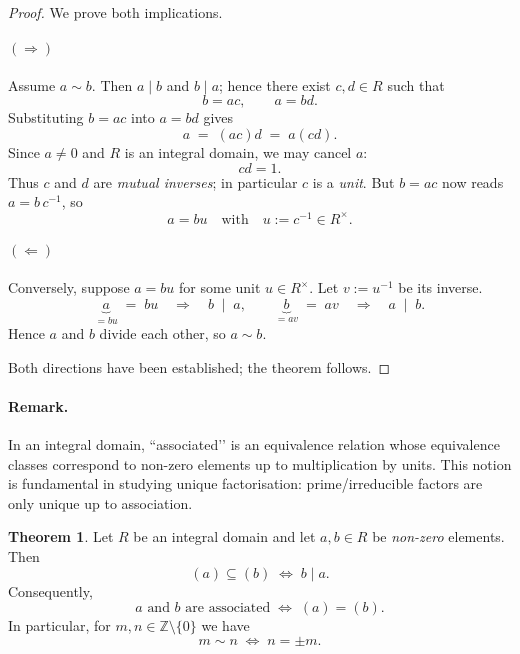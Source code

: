 \documentclass[12pt]{article}
\theoremstyle{definition} %
\newtheorem{theorem}{Theorem}
\theoremstyle{plain} %
\begin{document}
\begin{proof}
  We prove both implications.

  \paragraph*{\((\Rightarrow)\)}
  Assume \(a\sim b\).  
  Then \(a\mid b\) and \(b\mid a\); hence there exist \(c,d\in R\) such that
  \[
      b = ac,
      \qquad
      a = bd .
  \]
  Substituting \(b=ac\) into \(a=bd\) gives
  \[
      a
      \;=\;
      (ac)d
      \;=\;
      a(cd).
  \]
  Since \(a\neq0\) and \(R\) is an integral domain, we may cancel \(a\):
  \[
      cd = 1 .
  \]
  Thus \(c\) and \(d\) are \emph{mutual inverses}; in particular
  \(c\) is a \emph{unit}.  
  But \(b = ac\) now reads \(a = b\,c^{-1}\), so
  \[
      a = bu
      \quad\text{with}\quad
      u := c^{-1}\in R^{\times}.
  \]

  \paragraph*{\((\Leftarrow)\)}
  Conversely, suppose \(a = bu\) for some unit \(u\in R^{\times}\).
  Let \(v:=u^{-1}\) be its inverse.
  \[
      \underbrace{a}_{=bu}\;=\;bu 
      \quad\Longrightarrow\quad
      b\;\mid\; a ,
      \qquad
      \underbrace{b}_{=av}\;=\;av 
      \quad\Longrightarrow\quad
      a\;\mid\; b .
  \]
  Hence \(a\) and \(b\) divide each other, so \(a\sim b\).

  Both directions have been established; the theorem follows.
\end{proof}

\paragraph{Remark.}
In an integral domain, “associated’’ is an equivalence relation whose
equivalence classes correspond to non-zero elements up to multiplication by units.
This notion is fundamental in studying unique factorisation:
prime/irreducible factors are only unique up to association.
\begin{theorem}
  Let \(R\) be an integral domain and let \(a,b\in R\) be \emph{non-zero} elements.  
  Then
  \[
     (a) \subseteq (b)
     \;\Longleftrightarrow\;
     b \mid a .
  \]
  Consequently,
  \[
     a \text{ and } b \text{ are associated}
     \;\Longleftrightarrow\;
     (a) = (b).
  \]
  In particular, for \(m,n\in\mathbb Z\setminus\{0\}\) we have
  \[
     m \sim n
     \;\Longleftrightarrow\;
     n=\pm m .
  \]
\end{theorem}
\end{document}
